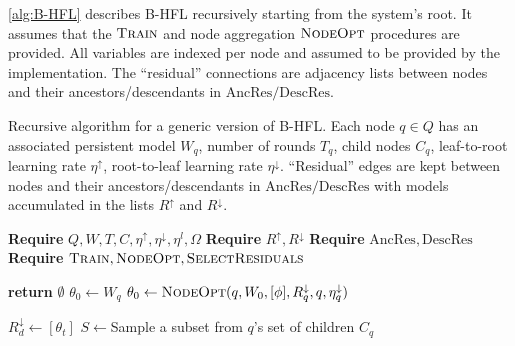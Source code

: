 \cref{alg:B-HFL} describes B-HFL recursively starting from the system's root. It assumes that the $\textsc{Train}$ and node aggregation $\textsc{NodeOpt}$ procedures are provided. All variables are indexed per node and assumed to be provided by the implementation. The ``residual'' connections are adjacency lists between nodes and their ancestors/descendants in $\mathrm{AncRes}/\mathrm{DescRes}$.

\begin{algorithm}[H]
    \caption[Bidirectional Hierarchical FL]{Recursive algorithm for a generic version of B-HFL\@. Each node $q \in Q$ has an associated persistent model $W_q$, number of rounds $T_q$, child nodes $C_q$, leaf-to-root learning rate $\eta^\uparrow$, root-to-leaf learning rate $\eta^\downarrow$. ``Residual'' edges are kept between nodes and their ancestors/descendants in $\mathrm{AncRes}/\mathrm{DescRes}$
        with models accumulated in the lists $R^\uparrow$ and $R^\downarrow$. }\label{alg:B-HFL}
    \begin{onehalfspace}

        \begin{algorithmic}[1]
            \State \textbf{Require} \(Q, W, T, C, \eta^\uparrow, \eta^\downarrow, \eta^l, \Omega\) \label{alg:B-HFL:line:r0}
            \State \textbf{Require}  $R^{\uparrow},R^{\downarrow}$  \label{alg:B-HFL:line:r1}
            \State \textbf{Require}  $\mathrm{AncRes},\mathrm{DescRes} $  \label{alg:B-HFL:line:r2}
            \State \textbf{Require}  \(\textsc{Train} ,\textsc{NodeOpt}, \textsc{SelectResiduals}  \) \label{alg:B-HFL:line:r3}

              \label{alg:B-HFL:line:1}
            \textbf{return} $\emptyset$  \label{alg:B-HFL:line:2}
            \EndIf
            \State $\theta_0 \gets W_q$   \label{alg:B-HFL:line:3}
            \If{$\phi \neq \emptyset$} \label{alg:B-HFL:line:4}
            \State $\theta_0 \gets \Call{NodeOpt}{q,W_0,[\phi], R^\downarrow_q, q, \eta^\downarrow_q} $  \label{alg:B-HFL:line:5}
            \EndIf



             \label{alg:B-HFL:line:6}
              \label{alg:B-HFL:line:8}
            \State $ R^\downarrow_d \gets [\theta_t]$ \label{alg:B-HFL:line:9}
            \EndFor
            \State $S \gets $Sample a subset from $q$'s set of children $C_q$ \label{alg:B-HFL:line:10}



\end{algorithmic}
\end{onehalfspace}
\end{algorithm}
